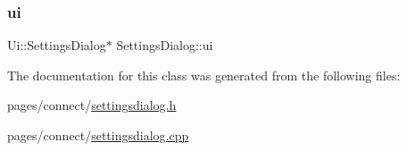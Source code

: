\subsubsection{\texorpdfstring{ui}{ui}}
{\footnotesize\ttfamily Ui\+::\+Settings\+Dialog$\ast$ Settings\+Dialog\+::ui\hspace{0.3cm}{\ttfamily [private]}}



The documentation for this class was generated from the following files\+:\begin{DoxyCompactItemize}
\item 
pages/connect/\mbox{\hyperlink{settingsdialog_8h}{settingsdialog.\+h}}\item 
pages/connect/\mbox{\hyperlink{settingsdialog_8cpp}{settingsdialog.\+cpp}}\end{DoxyCompactItemize}
